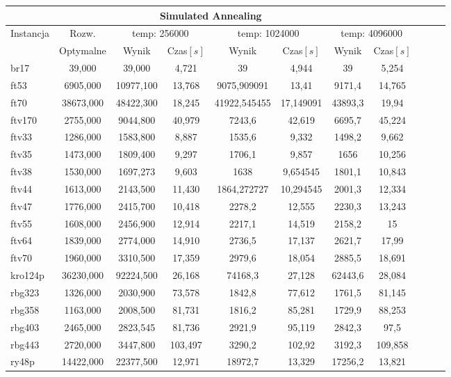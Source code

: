 \begin{center}

\begin{tabular}{lcccccccccc}

\toprule
\multicolumn{8}{c}{Simulated Annealing} \\
\midrule
\multirow{2}{*}{Instancja} & {Rozw.} &
\multicolumn{2}{c}{temp: 256000} & \multicolumn{2}{c}{temp: 1024000} & 
\multicolumn{2}{c}{temp: 4096000}
 \\
 & Optymalne & Wynik & Czas$[s]$ & Wynik & Czas$[s]$ & Wynik & Czas$[s]$ 
  \\
\toprule
br17 & 39,000 & 39,000 & 4,721 & 39 & 4,944 & 39 & 5,254 \\
\midrule
ft53 & 6905,000 & 10977,100 & 13,768 & 9075,909091 & 13,41 & 9171,4 & 14,765 \\
\midrule
ft70 & 38673,000 & 48422,300 & 18,245 & 41922,545455 & 17,149091 & 43893,3 & 19,94 \\
\midrule
ftv170 & 2755,000 & 9044,800 & 40,979 & 7243,6 & 42,619 & 6695,7 & 45,224 \\
\midrule
ftv33 & 1286,000 & 1583,800 & 8,887 & 1535,6 & 9,332 & 1498,2 & 9,662 \\
\midrule
ftv35 & 1473,000 & 1809,400 & 9,297 & 1706,1 & 9,857 & 1656 & 10,256 \\
\midrule
ftv38 & 1530,000 & 1697,273 & 9,603 & 1638 & 9,654545 & 1801,1 & 10,843 \\
\midrule
ftv44 & 1613,000 & 2143,500 & 11,430 & 1864,272727 & 10,294545 & 2001,3 & 12,334 \\
\midrule
ftv47 & 1776,000 & 2415,700 & 10,418 & 2278,2 & 12,555 & 2230,3 & 13,243 \\
\midrule
ftv55 & 1608,000 & 2456,900 & 12,914 & 2217,1 & 14,519 & 2158,2 & 15 \\
\midrule
ftv64 & 1839,000 & 2774,000 & 14,910 & 2736,5 & 17,137 & 2621,7 & 17,99 \\
\midrule
ftv70 & 1960,000 & 3310,500 & 17,359 & 2979,6 & 18,054 & 2885,5 & 18,691 \\
\midrule
kro124p & 36230,000 & 92224,500 & 26,168 & 74168,3 & 27,128 & 62443,6 & 28,084 \\
\midrule
rbg323 & 1326,000 & 2030,900 & 73,578 & 1842,8 & 77,612 & 1761,5 & 81,145 \\
\midrule
rbg358 & 1163,000 & 2008,500 & 81,731 & 1816,2 & 85,281 & 1729,9 & 88,253 \\
\midrule
rbg403 & 2465,000 & 2823,545 & 81,736 & 2921,9 & 95,119 & 2842,3 & 97,5 \\
\midrule
rbg443 & 2720,000 & 3447,800 & 103,497 & 3290,2 & 102,92 & 3192,3 & 109,858 \\
\midrule
ry48p & 14422,000 & 22377,500 & 12,971 & 18972,7 & 13,329 & 17256,2 & 13,821 \\
\bottomrule
\end{tabular}
\end{center}





